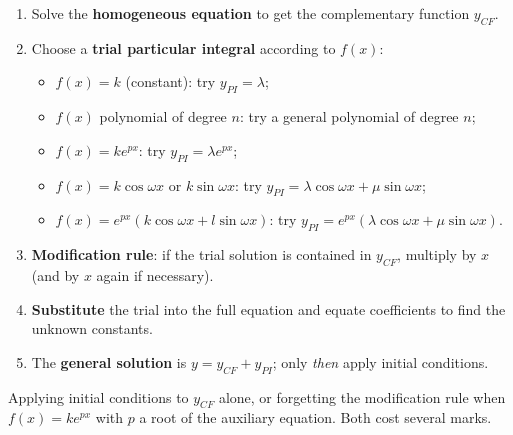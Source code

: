 \documentclass[11pt]{article}
\begin{document}
\begin{methode}[Solving $a\ddot{y}+b\dot{y}+cy=f(x)$]
\begin{enumerate}
\item Solve the \textbf{homogeneous equation} to get the complementary function $y_{CF}$.
\item Choose a \textbf{trial particular integral} according to $f(x)$:
\begin{itemize}
\item $f(x)=k$ (constant): try $y_{PI}=\lambda$;
\item $f(x)$ polynomial of degree $n$: try a general polynomial of degree $n$;
\item $f(x)=ke^{px}$: try $y_{PI}=\lambda e^{px}$;
\item $f(x)=k\cos\omega x$ or $k\sin\omega x$: try $y_{PI}=\lambda\cos\omega x+\mu\sin\omega x$;
\item $f(x)=e^{px}(k\cos\omega x + l\sin\omega x)$: try $y_{PI}=e^{px}(\lambda\cos\omega x+\mu\sin\omega x)$.
\end{itemize}
\item \textbf{Modification rule}: if the trial solution is contained in $y_{CF}$, multiply by $x$ (and by $x$ again if necessary).
\item \textbf{Substitute} the trial into the full equation and equate coefficients to find the unknown constants.
\item The \textbf{general solution} is $y=y_{CF}+y_{PI}$; only \emph{then} apply initial conditions.
\end{enumerate}
\begin{attention}
Applying initial conditions to $y_{CF}$ alone, or forgetting the modification rule when $f(x)=ke^{px}$ with $p$ a root of the auxiliary equation. Both cost several marks.
\end{attention}
\end{methode}
\end{document}
